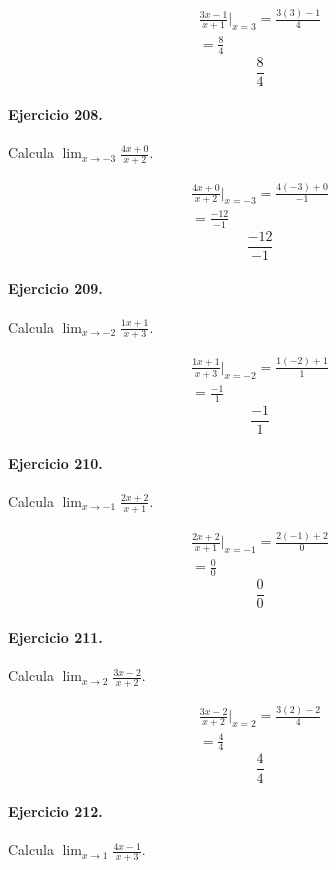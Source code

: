\documentclass[11pt,a4paper]{article}
\begin{document}
\[
\begin{aligned}
\frac{3x-1}{x+1}\Big|_{x=3}=\frac{3(3)-1}{4}\\
=\frac{8}{4}
\end{aligned}
\]
\[\boxed{\frac{8}{4}}\]


\paragraph{Ejercicio 208.} Calcula $\displaystyle\lim_{x\to -3}\frac{4x+0}{x+2}$. 

\[
\begin{aligned}
\frac{4x+0}{x+2}\Big|_{x=-3}=\frac{4(-3)+0}{-1}\\
=\frac{-12}{-1}
\end{aligned}
\]
\[\boxed{\frac{-12}{-1}}\]


\paragraph{Ejercicio 209.} Calcula $\displaystyle\lim_{x\to -2}\frac{1x+1}{x+3}$. 

\[
\begin{aligned}
\frac{1x+1}{x+3}\Big|_{x=-2}=\frac{1(-2)+1}{1}\\
=\frac{-1}{1}
\end{aligned}
\]
\[\boxed{\frac{-1}{1}}\]


\paragraph{Ejercicio 210.} Calcula $\displaystyle\lim_{x\to -1}\frac{2x+2}{x+1}$. 

\[
\begin{aligned}
\frac{2x+2}{x+1}\Big|_{x=-1}=\frac{2(-1)+2}{0}\\
=\frac{0}{0}
\end{aligned}
\]
\[\boxed{\frac{0}{0}}\]


\paragraph{Ejercicio 211.} Calcula $\displaystyle\lim_{x\to 2}\frac{3x-2}{x+2}$. 

\[
\begin{aligned}
\frac{3x-2}{x+2}\Big|_{x=2}=\frac{3(2)-2}{4}\\
=\frac{4}{4}
\end{aligned}
\]
\[\boxed{\frac{4}{4}}\]


\paragraph{Ejercicio 212.} Calcula $\displaystyle\lim_{x\to 1}\frac{4x-1}{x+3}$. 
\end{document}
